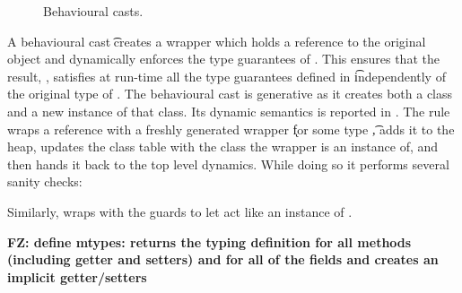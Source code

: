 \documentclass[acmlarge, anonymous, authordraft]{acmart}
\newcommand{\FZ}[1]{\textbf{FZ: #1}}
\begin{document}
\begin{figure}[!ht]
  \begin{mathpar}
  

\end{mathpar}


\hrulefill
\vspace{-2mm}
\caption{Behavioural casts.}\label{behavetext}
\end{figure}

A behavioural cast \BehCast\t\a creates a wrapper which holds a
reference to the original object \a and dynamically enforces the type
guarantees of \ap.  This ensures that the result, \ap, satisfies at run-time 
all  the type guarantees defined in \t independently of the original type of \a.  The behavioural cast is generative as it creates both a class
and a new instance of that class. Its dynamic semantics is reported in
. The rule  wraps a reference \a with a freshly generated
wrapper \k for some type \t, adds it to the heap, updates the class table with the class the wrapper is an instance of, and then hands it back
to the top level dynamics. While doing so it performs several sanity checks:


Similarly,  wraps
\a with the guards to let \a act like an instance of \any.

\FZ{define mtypes: returns the typing definition for all methods (including getter and setters) and for all of the fields and creates an implicit getter/setters}
\end{document}
